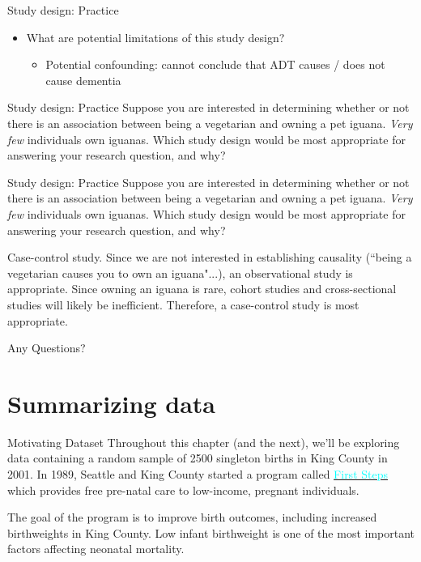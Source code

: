 \documentclass[10pt,t]{beamer}
\begin{document}
\begin{frame}{Study design: Practice}
\begin{itemize}
	\item What are potential limitations of this study design?
	\begin{itemize}
		\item[] \color{cyan} Potential confounding: cannot conclude that ADT causes / does not cause dementia
	\end{itemize}
\end{itemize}
\end{frame}

\begin{frame}{Study design: Practice}
Suppose you are interested in determining whether or not there is an association between being a vegetarian and owning a pet iguana. \textit{Very few} individuals own iguanas. Which study design would be most appropriate for answering your research question, and why?
\end{frame}

\begin{frame}{Study design: Practice}
Suppose you are interested in determining whether or not there is an association between being a vegetarian and owning a pet iguana. \textit{Very few} individuals own iguanas. Which study design would be most appropriate for answering your research question, and why? 

\vspace{0.3cm}

\color{cyan} Case-control study. Since we are not interested in establishing causality (``being a vegetarian causes you to own an iguana"...), an observational study is appropriate. Since owning an iguana is rare, cohort studies and cross-sectional studies will likely be inefficient. Therefore, a case-control study is most appropriate.

\end{frame}

\begin{frame}[c]
\centering \huge Any Questions?
\end{frame}

\section{Summarizing data}


\begin{frame}{Motivating Dataset}
Throughout this chapter (and the next), we'll be exploring data containing a random sample of 2500 singleton births in King County in 2001. In 1989, Seattle and King County started a program called \href{https://kingcounty.gov/depts/health/child-teen-health/maternity-support-infant-case-management.aspx}{\textcolor{cyan}{First Steps}} which provides free pre-natal care to low-income, pregnant individuals. 

\vspace{0.3cm}

The goal of the program is to improve birth outcomes, including increased birthweights in King County. Low infant birthweight is one of the most important factors affecting neonatal mortality. 

\end{frame}
\end{document}
